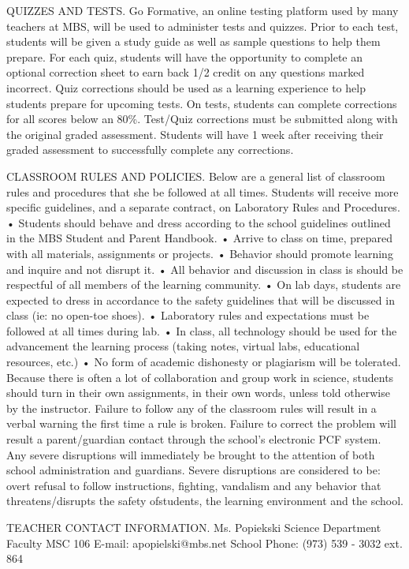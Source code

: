 \documentclass{article}
\begin{document}
QUIZZES AND TESTS.
Go Formative, an online testing platform used by many teachers at MBS, will be used to administer tests and quizzes.
Prior to each test, students will be given a study guide as well as sample questions to help them prepare.
For each quiz, students will have the opportunity to complete an optional correction sheet to earn back 1/2 credit on any questions marked incorrect. Quiz corrections should be used as a learning experience to help students prepare for upcoming tests.
On tests, students can complete corrections for all scores below an 80\%.
Test/Quiz corrections must be submitted along with the original graded assessment.
Students will have 1 week after receiving their graded assessment to successfully complete any corrections.

CLASSROOM RULES AND POLICIES.
Below are a general list of classroom rules and procedures that she be followed at all times.
Students will receive more specific guidelines, and a separate contract, on Laboratory Rules
and Procedures.
• Students should behave and dress according to the school guidelines outlined in the MBS Student and Parent Handbook.
• Arrive to class on time, prepared with all materials, assignments or projects.
• Behavior should promote learning and inquire and not disrupt it.
• All behavior and discussion in class is should be respectful of all members of the learning community.
• On lab days, students are expected to dress in accordance to the safety guidelines that will be discussed in class (ie: no open-toe shoes).
• Laboratory rules and expectations must be followed at all times during lab.
• In class, all technology should be used for the advancement the learning process (taking notes, virtual labs, educational resources, etc.)
• No form of academic dishonesty or plagiarism will be tolerated. Because there is often a lot of collaboration and group work in science, students should turn in their own assignments, in their own words, unless told otherwise by the instructor.
Failure to follow any of the classroom rules will result in a verbal warning the first time a rule is broken.
Failure to correct the problem will result a parent/guardian contact through the school’s electronic PCF system. Any severe disruptions will immediately be brought to the attention of
both school administration and guardians. Severe disruptions are considered to be: overt refusal to follow instructions, fighting, vandalism and any behavior that threatens/disrupts the safety ofstudents, the learning environment and the school.

TEACHER CONTACT INFORMATION.
Ms. Popiekski
Science Department Faculty
MSC 106
E-mail: apopielski@mbs.net
School Phone: (973) 539 - 3032 ext. 864
\end{document}
